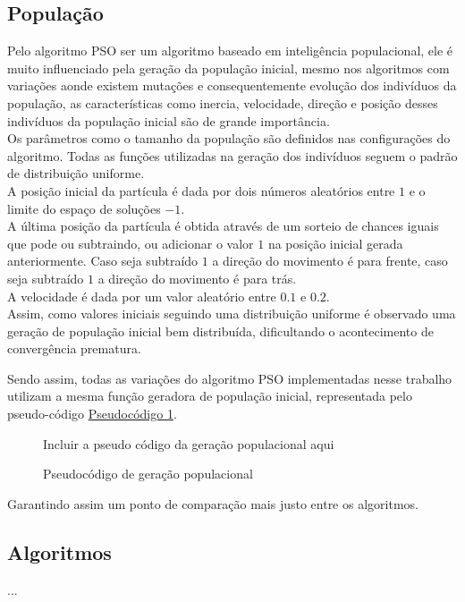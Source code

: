 \subsection{População}
Pelo algoritmo PSO ser um algoritmo baseado em inteligência populacional, ele é muito influenciado pela geração da população inicial, mesmo nos algoritmos com variações aonde existem mutações e consequentemente evolução dos indivíduos da população, as características como inercia, velocidade, direção e posição desses indivíduos da população inicial são de grande importância.\\
\indent Os parâmetros como o tamanho da população são definidos nas configurações do algoritmo. Todas as funções utilizadas na geração dos indivíduos seguem o padrão de distribuição uniforme.\\
\indent A posição inicial da partícula é dada por dois números aleatórios entre $1$ e o limite do espaço de soluções $- 1$.\\
\indent A última posição da partícula é obtida através de um sorteio de chances iguais que pode ou subtraindo, ou adicionar o valor $1$ na posição inicial gerada anteriormente. Caso seja subtraído $1$ a direção do movimento é para frente, caso seja subtraído $1$ a direção do movimento é para trás.\\
\indent A velocidade é dada por um valor aleatório entre $0.1$ e $0.2$.\\
\indent Assim, como valores iniciais seguindo uma distribuição uniforme é observado uma geração de população inicial bem distribuída, dificultando o acontecimento de convergência prematura.

Sendo assim, todas as variações do algoritmo PSO implementadas nesse trabalho utilizam a mesma função geradora de população inicial, representada pelo pseudo-código \hyperref[cod:geracao-pop]{Pseudocódigo \ref{cod:geracao-pop}}.

\begin{figure}[ht]
\centering
\small{Incluir a pseudo código da geração populacional aqui}
\caption{Pseudocódigo de geração populacional}
\label{cod:geracao-pop}
\end{figure}

\noindent Garantindo assim um ponto de comparação mais justo entre os algoritmos.

%


\subsection{Algoritmos}
...

